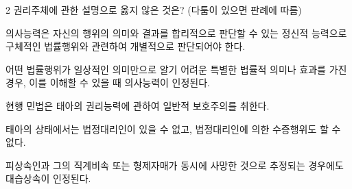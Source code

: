 \begin{question}{2}
권리주체에 관한 설명으로 옳지 않은 것은? (다툼이 있으면 판례에 따름)
\begin{choices}
  \item 의사능력은 자신의 행위의 의미와 결과를 합리적으로 판단할 수 있는 정신적 능력으로 구체적인 법률행위와 관련하여 개별적으로 판단되어야 한다.
  \item 어떤 법률행위가 일상적인 의미만으로 알기 어려운 특별한 법률적 의미나 효과를 가진 경우, 이를 이해할 수 있을 때 의사능력이 인정된다.
  \item 현행 민법은 태아의 권리능력에 관하여 일반적 보호주의를 취한다.
  \item 태아의 상태에서는 법정대리인이 있을 수 없고, 법정대리인에 의한 수증행위도 할 수 없다.
  \item 피상속인과 그의 직계비속 또는 형제자매가 동시에 사망한 것으로 추정되는 경우에도 대습상속이 인정된다.
\end{choices}
\end{question}
